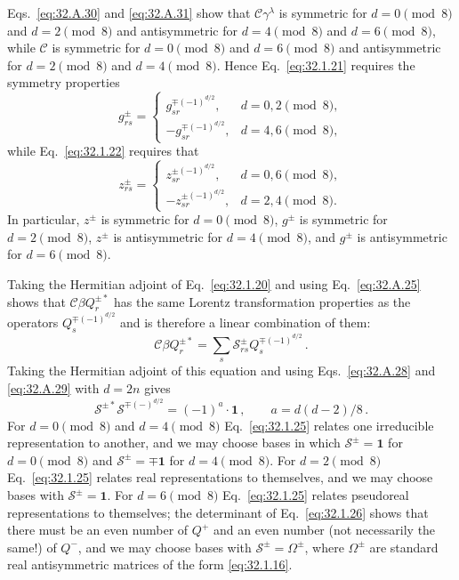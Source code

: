 Eqs.~\eqref{eq:32.A.30} and \eqref{eq:32.A.31} show that
\(\mathcal C\gamma^\lambda\) is symmetric for \(d=0\pmod 8\) and
\(d=2\pmod 8\) and antisymmetric for \(d=4\pmod 8\) and
\(d=6\pmod 8\), while \(\mathcal C\) is symmetric for \(d=0\pmod 8\)
and \(d=6\pmod 8\) and antisymmetric for \(d=2\pmod 8\) and
\(d=4\pmod 8\). Hence Eq.~\eqref{eq:32.1.21} requires the symmetry
properties
\begin{equation}
  g_{rs}^{\pm}=
  \begin{cases}
    g_{sr}^{\mp(-1)^{d/2}}, & d=0,2\pmod 8,\\
    -g_{sr}^{\mp(-1)^{d/2}}, & d=4,6\pmod 8,
  \end{cases}
  \tag{32.1.23}\label{eq:32.1.23}
\end{equation}
while Eq.~\eqref{eq:32.1.22} requires that
\begin{equation}
  z_{rs}^{\pm}=
  \begin{cases}
    z_{sr}^{\pm(-1)^{d/2}}, & d=0,6\pmod 8,\\
    -z_{sr}^{\pm(-1)^{d/2}}, & d=2,4\pmod 8.
  \end{cases}
  \tag{32.1.24}\label{eq:32.1.24}
\end{equation}
In particular, \(z^\pm\) is symmetric for \(d=0\pmod 8\), \(g^\pm\) is
symmetric for \(d=2\pmod 8\), \(z^\pm\) is antisymmetric for
\(d=4\pmod 8\), and \(g^\pm\) is antisymmetric for \(d=6\pmod 8\).

Taking the Hermitian adjoint of Eq.~\eqref{eq:32.1.20} and using
Eq.~\eqref{eq:32.A.25} shows that
\(\mathcal C\beta Q_r^{\pm*}\) has the same Lorentz transformation
properties as the operators \(Q_s^{\mp(-1)^{d/2}}\) and is therefore a
linear combination of them:
\begin{equation}
  \mathcal C\beta Q_r^{\pm*}
  =\sum_s\mathcal S_{rs}^{\pm}Q_s^{\mp(-1)^{d/2}}\,.
  \tag{32.1.25}\label{eq:32.1.25}
\end{equation}
Taking the Hermitian adjoint of this equation and using
Eqs.~\eqref{eq:32.A.28} and \eqref{eq:32.A.29} with \(d=2n\) gives
\begin{equation}
  \mathcal S^{\pm*}\mathcal S^{\mp(-)^{d/2}}
  =(-1)^a\mathbin{\cdot}\mathbf{1}\,,
  \qquad a=d(d-2)/8\,.
  \tag{32.1.26}\label{eq:32.1.26}
\end{equation}
For \(d=0\pmod 8\) and \(d=4\pmod 8\)
Eq.~\eqref{eq:32.1.25} relates one irreducible representation to another,
and we may choose bases in which \(\mathcal S^\pm=\mathbf{1}\) for
\(d=0\pmod 8\) and \(\mathcal S^\pm=\mp\mathbf{1}\) for
\(d=4\pmod 8\). For \(d=2\pmod 8\) Eq.~\eqref{eq:32.1.25} relates real
representations to themselves, and we may choose bases with
\(\mathcal S^\pm=\mathbf{1}\). For \(d=6\pmod 8\)
Eq.~\eqref{eq:32.1.25} relates pseudoreal representations to themselves;
the determinant of Eq.~\eqref{eq:32.1.26} shows that there must be an even
number of \(Q^+\) and an even number (not necessarily the same!) of \(Q^-\),
and we may choose bases with \(\mathcal S^\pm=\Omega^\pm\), where
\(\Omega^\pm\) are standard real antisymmetric matrices of the form
\eqref{eq:32.1.16}.

